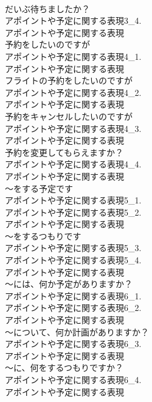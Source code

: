 \documentclass[8pt]{extreport}
\begin{document}
\begin{CJK}{UTF8}{min}
\\	だいぶ待ちましたか？	
\\	アポイントや予定に関する表現3_4.
\\	アポイントや予定に関する表現
\\	予約をしたいのですが	
\\	アポイントや予定に関する表現4_1.
\\	アポイントや予定に関する表現
\\	フライトの予約をしたいのですが	
\\	アポイントや予定に関する表現4_2.
\\	アポイントや予定に関する表現
\\	予約をキャンセルしたいのですが	
\\	アポイントや予定に関する表現4_3.
\\	アポイントや予定に関する表現
\\	予約を変更してもらえますか？	
\\	アポイントや予定に関する表現4_4.
\\	アポイントや予定に関する表現
\\	～をする予定です	
\\	アポイントや予定に関する表現5_1.
\\	アポイントや予定に関する表現5_2.
\\	アポイントや予定に関する表現
\\	～をするつもりです	
\\	アポイントや予定に関する表現5_3.
\\	アポイントや予定に関する表現5_4.
\\	アポイントや予定に関する表現
\\	～には、何か予定がありますか？	
\\	アポイントや予定に関する表現6_1.
\\	アポイントや予定に関する表現6_2.
\\	アポイントや予定に関する表現
\\	～について、何か計画がありますか？	
\\	アポイントや予定に関する表現6_3.
\\	アポイントや予定に関する表現
\\	～に、何をするつもりですか？	
\\	アポイントや予定に関する表現6_4.
\\	アポイントや予定に関する表現
\end{CJK}
\end{document}
